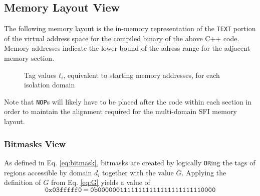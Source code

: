 \documentclass[12pt]{article}
\begin{document}
\subsection{Memory Layout View}

The following memory layout is the in-memory representation of the \verb|TEXT| portion of the virtual address space for the compiled binary of the above C++ code. Memory addresses indicate the lower bound of the adress range for the adjacent memory section.\\

\begin{figure}[t]
\begin{drawstack}
	\startframe
		 
	\startframe
		 
	\startframe
		 
	\startframe
		 
	\startframe
		 
	\startframe
		 
	\startframe
		 
\end{drawstack}
\caption{Tag values $t_i$, equivalent to starting memory addresses, for each isolation domain}
\end{figure}

Note that \texttt{NOP}s will likely have to be placed after the code within each section in order to maintain the alignment required for the multi-domain SFI memory layout.

\subsubsection{Bitmasks View}

As defined in Eq.  \ref{eq:bitmask}, bitmasks are created by logically \texttt{OR}ing the tags of regions accessible by domain $d_i$ together with the value $G$. Applying the definition of $G$ from Eq. \ref{eq:G} yields a value of
$$ \texttt{0x03fffff0}\ =\ \texttt{0b00000011111111111111111111110000} $$
\end{document}
